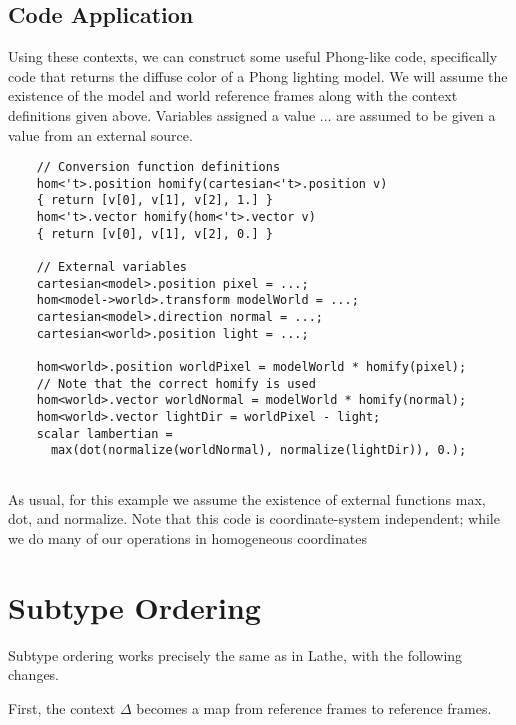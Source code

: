 \documentclass{article}
\begin{document}
\subsection{Code Application}
Using these contexts, we can construct some useful Phong-like code, specifically code that returns the diffuse color of a Phong lighting model.  
We will assume the existence of the \textsf{model} and \textsf{world} reference frames along with the context definitions given above.
Variables assigned a value $\dots$ are assumed to be given a value from an external source.

\begin{lstlisting}
	// Conversion function definitions
	hom<'t>.position homify(cartesian<'t>.position v) 
	{ return [v[0], v[1], v[2], 1.] }
	hom<'t>.vector homify(hom<'t>.vector v) 
	{ return [v[0], v[1], v[2], 0.] }
	
	// External variables
	cartesian<model>.position pixel = ...;
	hom<model->world>.transform modelWorld = ...;
	cartesian<model>.direction normal = ...;
	cartesian<world>.position light = ...;
	
	hom<world>.position worldPixel = modelWorld * homify(pixel);
	// Note that the correct homify is used
	hom<world>.vector worldNormal = modelWorld * homify(normal);
	hom<world>.vector lightDir = worldPixel - light;
	scalar lambertian = 
	  max(dot(normalize(worldNormal), normalize(lightDir)), 0.);
	
\end{lstlisting}

As usual, for this example we assume the existence of external functions \textsf{max}, \textsf{dot}, and \textsf{normalize}.  Note that this code is coordinate-system independent; while we do many of our operations in homogeneous coordinates

\section{Subtype Ordering}
Subtype ordering works precisely the same as in Lathe, with the following changes.

First, the context $\Delta$ becomes a map from reference frames to reference frames.
\end{document}
